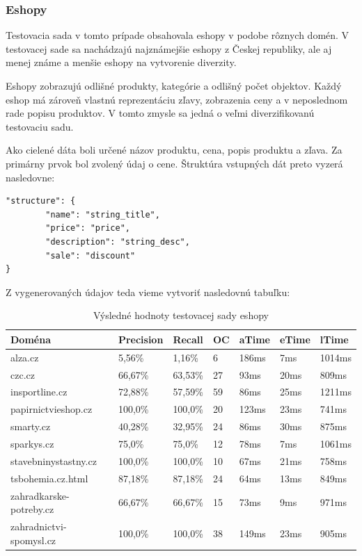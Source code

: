\newpage

\subsubsection{Eshopy}

Testovacia sada v tomto prípade obsahovala eshopy v podobe rôznych domén. V testovacej sade sa nachádzajú najznámejšie eshopy z Českej republiky, ale aj menej známe a menšie eshopy na vytvorenie diverzity.

Eshopy zobrazujú odlišné produkty, kategórie a odlišný počet objektov. Každý eshop má zároveň vlastnú reprezentáciu zľavy, zobrazenia ceny a v neposlednom rade popisu produktov. V tomto zmysle sa jedná o veľmi diverzifikovanú testovaciu sadu.

\bigskip

Ako cielené dáta boli určené názov produktu, cena, popis produktu a zľava. Za primárny prvok bol zvolený údaj o cene. Štruktúra vstupných dát preto vyzerá nasledovne:

\bigskip

\begin{lstlisting}
"structure": {
        "name": "string_title",
        "price": "price",
        "description": "string_desc",
        "sale": "discount"
}
\end{lstlisting}

\bigskip

Z vygenerovaných údajov teda vieme vytvoriť nasledovnú tabuľku:

\begin{table}[hbt]
\caption{Výsledné hodnoty testovacej sady eshopy}
\centering
\begin{tabular}{|l|l|l|l|l|l|l|}
\hline
\textbf{Doména}          & \textbf{Precision} & \textbf{Recall}  & \textbf{OC}  & \textbf{aTime} & \textbf{eTime} & \textbf{lTime}  \\ \hline
alza.cz                 & 5,56\%    & 1,16\%  & 6  & 186ms & 7ms   & 1014ms \\ \hline
czc.cz                  & 66,67\%   & 63,53\% & 27 & 93ms  & 20ms  & 809ms  \\ \hline
insportline.cz          & 72,88\%   & 57,59\% & 59 & 86ms  & 25ms  & 1211ms \\ \hline
papirnictvieshop.cz     & 100,0\%   & 100,0\% & 20 & 123ms & 23ms  & 741ms  \\ \hline
smarty.cz               & 40,28\%   & 32,95\% & 24 & 86ms  & 30ms  & 875ms  \\ \hline
sparkys.cz              & 75,0\%    & 75,0\%  & 12 & 78ms  & 7ms   & 1061ms \\ \hline
stavebninystastny.cz    & 100,0\%   & 100,0\% & 10 & 67ms  & 21ms  & 758ms  \\ \hline
tsbohemia.cz.html       & 87,18\%   & 87,18\% & 24 & 64ms  & 13ms  & 849ms  \\ \hline
zahradkarske-potreby.cz & 66,67\%   & 66,67\% & 15 & 73ms  & 9ms   & 971ms  \\ \hline
zahradnictvi-spomysl.cz & 100,0\%   & 100,0\% & 38 & 149ms & 23ms  & 905ms  \\ \hline
\end{tabular}
\end{table}

